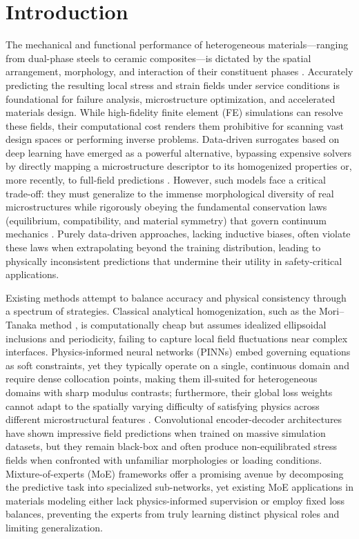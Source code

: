 \documentclass{article}
\begin{document}
\section{Introduction}
The mechanical and functional performance of heterogeneous materials—ranging from dual-phase steels to ceramic composites—is dictated by the spatial arrangement, morphology, and interaction of their constituent phases \cite{torquato2002random,nematnasser1993micromechanics}. Accurately predicting the resulting local stress and strain fields under service conditions is foundational for failure analysis, microstructure optimization, and accelerated materials design. While high-fidelity finite element (FE) simulations \cite{belytschko2014nonlinear} can resolve these fields, their computational cost renders them prohibitive for scanning vast design spaces or performing inverse problems. Data-driven surrogates based on deep learning have emerged as a powerful alternative, bypassing expensive solvers by directly mapping a microstructure descriptor to its homogenized properties \cite{bessa2017framework,liu2017material} or, more recently, to full-field predictions \cite{yang2020predicting,kasim2021building}. However, such models face a critical trade-off: they must generalize to the immense morphological diversity of real microstructures while rigorously obeying the fundamental conservation laws (equilibrium, compatibility, and material symmetry) that govern continuum mechanics \cite{de2020physics}. Purely data-driven approaches, lacking inductive biases, often violate these laws when extrapolating beyond the training distribution, leading to physically inconsistent predictions that undermine their utility in safety-critical applications.

Existing methods attempt to balance accuracy and physical consistency through a spectrum of strategies. Classical analytical homogenization, such as the Mori–Tanaka method \cite{mori1973average}, is computationally cheap but assumes idealized ellipsoidal inclusions and periodicity, failing to capture local field fluctuations near complex interfaces. Physics-informed neural networks (PINNs) \cite{raissi2019physics,lu2019deepxde} embed governing equations as soft constraints, yet they typically operate on a single, continuous domain and require dense collocation points, making them ill-suited for heterogeneous domains with sharp modulus contrasts; furthermore, their global loss weights cannot adapt to the spatially varying difficulty of satisfying physics across different microstructural features \cite{wang2020understanding}. Convolutional encoder-decoder architectures \cite{bessa2017framework,zhu2018physics} have shown impressive field predictions when trained on massive simulation datasets, but they remain black-box and often produce non-equilibrated stress fields when confronted with unfamiliar morphologies or loading conditions. Mixture-of-experts (MoE) frameworks \cite{jacobs1991adaptive,shazeer2017outrageously} offer a promising avenue by decomposing the predictive task into specialized sub-networks, yet existing MoE applications in materials modeling \cite{ma2018modeling} either lack physics-informed supervision or employ fixed loss balances, preventing the experts from truly learning distinct physical roles and limiting generalization.
\end{document}
